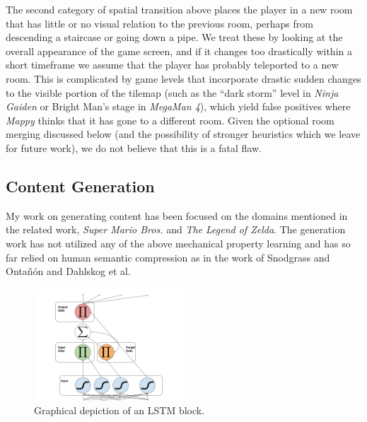 \documentclass[a4paper]{article}
\begin{document}
The second category of spatial transition above places the player in a new room that has little or no visual relation to the previous room, perhaps from descending a staircase or going down a pipe.
We treat these by looking at the overall appearance of the game screen, and if it changes too drastically within a short timeframe we assume that the player has probably teleported to a new room.
This is complicated by game levels that incorporate drastic sudden changes to the visible portion of the tilemap (such as the ``dark storm'' level in \emph{Ninja Gaiden} or Bright Man's stage in \emph{MegaMan 4}), which yield false positives where \emph{Mappy} thinks that it has gone to a different room.
Given the optional room merging discussed below (and the possibility of stronger heuristics which we leave for future work), we do not believe that this is a fatal flaw.

\subsection{Content Generation}

\label{sec:ContentGeneration}
My work on generating content has been focused on the domains mentioned in the related work, \textit{Super Mario Bros.} and \textit{The Legend of Zelda}.  The generation work has not utilized any of the above mechanical property learning and has so far relied on human semantic compression as in the work of Snodgrass and Onta{\~n}{\'o}n and Dahlskog et al.  

\begin{figure}[ht]
\centering
    \includegraphics[width=0.5\textwidth]{figures/LSTM_Cell.png}
    \caption{Graphical depiction of an LSTM block. }
    \label{fig:LSTM}
\end{figure}
\end{document}
